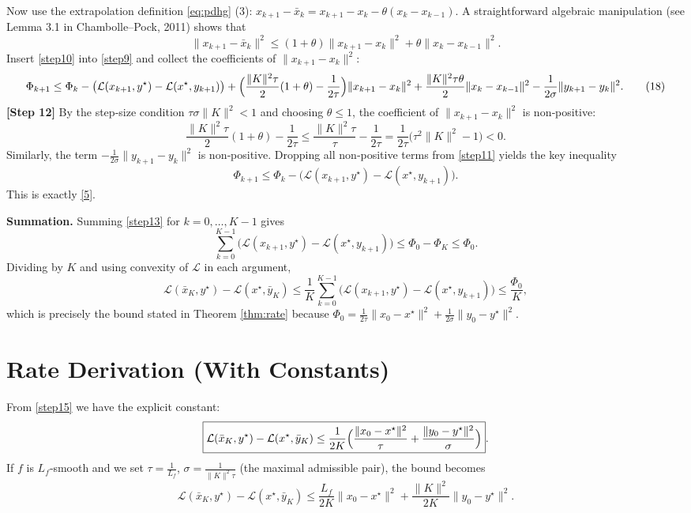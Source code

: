 \documentclass{article}
\begin{document}
Now use the extrapolation definition \eqref{eq:pdhg} (3):
$x_{k+1}-\bar{x}_{k}=x_{k+1}-x_{k}-\theta(x_{k}-x_{k-1})$.
A straightforward algebraic manipulation (see Lemma 3.1 in Chambolle–Pock, 2011) shows that
\[
\|x_{k+1}-\bar{x}_{k}\|^{2}
\le (1+\theta)\|x_{k+1}-x_{k}\|^{2}
+ \theta\|x_{k}-x_{k-1}\|^{2}.
\tag{17}\label{step10}
\]
Insert \eqref{step10} into \eqref{step9} and collect the coefficients of $\|x_{k+1}-x_{k}\|^{2}$:
\[
\Phi_{k+1}
\le \Phi_{k}
-\bigl(\mathcal{L}(x_{k+1},y^{\star})-\mathcal{L}(x^{\star},y_{k+1})\bigr)
+\Bigl(\frac{\|K\|^{2}\tau}{2}(1+\theta)-\frac{1}{2\tau}\Bigr)\|x_{k+1}-x_{k}\|^{2}
+ \frac{\|K\|^{2}\tau\theta}{2}\|x_{k}-x_{k-1}\|^{2}
-\frac{1}{2\sigma}\|y_{k+1}-y_{k}\|^{2}.
\tag{18}\label{step11}
\]
\textbf{[Step 12]} By the step‑size condition $\tau\sigma\|K\|^{2}<1$ and choosing $\theta\le 1$,
the coefficient of $\|x_{k+1}-x_{k}\|^{2}$ is non‑positive:
\[
\frac{\|K\|^{2}\tau}{2}(1+\theta)-\frac{1}{2\tau}
\le \frac{\|K\|^{2}\tau}{\tau}-\frac{1}{2\tau}
= \frac{1}{2\tau}\bigl(\tau^{2}\|K\|^{2}-1\bigr)<0.
\tag{19}\label{step12}
\]
Similarly, the term $-\frac{1}{2\sigma}\|y_{k+1}-y_{k}\|^{2}$ is non‑positive.
Dropping all non‑positive terms from \eqref{step11} yields the key inequality
\[
\Phi_{k+1}
\le \Phi_{k}
-\bigl(\mathcal{L}(x_{k+1},y^{\star})-\mathcal{L}(x^{\star},y_{k+1})\bigr).
\tag{20}\label{step13}
\]
This is exactly \eqref{5}.

\bigskip
\noindent\textbf{Summation.}
Summing \eqref{step13} for $k=0,\dots,K-1$ gives
\[
\sum_{k=0}^{K-1}\bigl(\mathcal{L}(x_{k+1},y^{\star})-\mathcal{L}(x^{\star},y_{k+1})\bigr)
\le \Phi_{0}-\Phi_{K}
\le \Phi_{0}.
\tag{21}\label{step14}
\]
Dividing by $K$ and using convexity of $\mathcal{L}$ in each argument,
\[
\mathcal{L}(\bar{x}_{K},y^{\star})-\mathcal{L}(x^{\star},\bar{y}_{K})
\le \frac{1}{K}\sum_{k=0}^{K-1}\bigl(\mathcal{L}(x_{k+1},y^{\star})-\mathcal{L}(x^{\star},y_{k+1})\bigr)
\le \frac{\Phi_{0}}{K},
\tag{22}\label{step15}
\]
which is precisely the bound stated in Theorem \ref{thm:rate} because
$\Phi_{0}= \frac{1}{2\tau}\|x_{0}-x^{\star}\|^{2}+ \frac{1}{2\sigma}\|y_{0}-y^{\star}\|^{2}$.

\section*{Rate Derivation (With Constants)}
From \eqref{step15} we have the explicit constant:
\[
\boxed{
\mathcal{L}(\bar{x}_{K},y^{\star})-\mathcal{L}(x^{\star},\bar{y}_{K})
\le
\frac{1}{2K}\Bigl(
\frac{\|x_{0}-x^{\star}\|^{2}}{\tau}
+\frac{\|y_{0}-y^{\star}\|^{2}}{\sigma}
\Bigr)}.
\]
If $f$ is $L_f$‑smooth and we set $\tau=\frac{1}{L_f}$, $\sigma=\frac{1}{\|K\|^{2}\tau}$
(the maximal admissible pair), the bound becomes
\[
\mathcal{L}(\bar{x}_{K},y^{\star})-\mathcal{L}(x^{\star},\bar{y}_{K})
\le
\frac{L_f}{2K}\|x_{0}-x^{\star}\|^{2}
+\frac{\|K\|^{2}}{2K}\|y_{0}-y^{\star}\|^{2}.
\]
\end{document}
